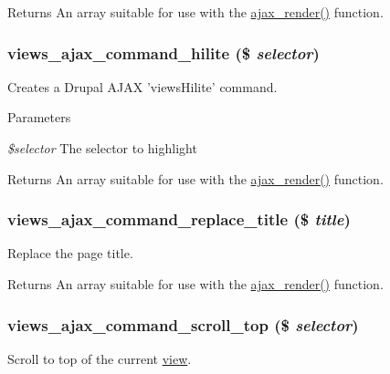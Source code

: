 \begin{DoxyReturn}{Returns}
An array suitable for use with the \hyperlink{group__ajax_ga241c2426bdde049c55b05b7bf5d714a2}{ajax\_\-render()} function. 
\end{DoxyReturn}
\hypertarget{group__ajax_ga22d27c9ab6b8a95f4903463eb6aabf8d}{
\subsubsection[{views\_\-ajax\_\-command\_\-hilite}]{\setlength{\rightskip}{0pt plus 5cm}views\_\-ajax\_\-command\_\-hilite (\$ {\em selector})}}
\label{group__ajax_ga22d27c9ab6b8a95f4903463eb6aabf8d}
Creates a Drupal AJAX 'viewsHilite' command.


\begin{DoxyParams}{Parameters}
\item[{\em \$selector}]The selector to highlight\end{DoxyParams}
\begin{DoxyReturn}{Returns}
An array suitable for use with the \hyperlink{group__ajax_ga241c2426bdde049c55b05b7bf5d714a2}{ajax\_\-render()} function. 
\end{DoxyReturn}
\hypertarget{group__ajax_ga42db219284fd40096900731ee6d13600}{
\subsubsection[{views\_\-ajax\_\-command\_\-replace\_\-title}]{\setlength{\rightskip}{0pt plus 5cm}views\_\-ajax\_\-command\_\-replace\_\-title (\$ {\em title})}}
\label{group__ajax_ga42db219284fd40096900731ee6d13600}
Replace the page title.

\begin{DoxyReturn}{Returns}
An array suitable for use with the \hyperlink{group__ajax_ga241c2426bdde049c55b05b7bf5d714a2}{ajax\_\-render()} function. 
\end{DoxyReturn}
\hypertarget{group__ajax_gac7d8055fd4e9c91501496391dbe94b5a}{
\subsubsection[{views\_\-ajax\_\-command\_\-scroll\_\-top}]{\setlength{\rightskip}{0pt plus 5cm}views\_\-ajax\_\-command\_\-scroll\_\-top (\$ {\em selector})}}
\label{group__ajax_gac7d8055fd4e9c91501496391dbe94b5a}
Scroll to top of the current \hyperlink{classview}{view}.


